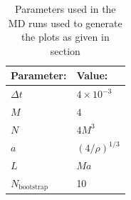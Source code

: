 \documentclass[10 pt, a4paper]{article}
\begin{document}
\begin{table}[H]
\centering
\begin{tabular}{l|l}
Parameter: & Value:                                           \\ \hline
$\Delta t$ & $4 \times 10^{-3}$       \\
$M$          & $4$                                         \\
$N$          & $4 M^3$         \\
$a$          & $(4/\rho)^{1/3}$ \\
$L$          & $M a$      \\
$N_{\mathrm{bootstrap}}$ & 10 \\                                       
\end{tabular}
\caption{Parameters used in the MD runs used to generate the plots as given in section \label{tab:params}}
\end{table}
\end{document}
